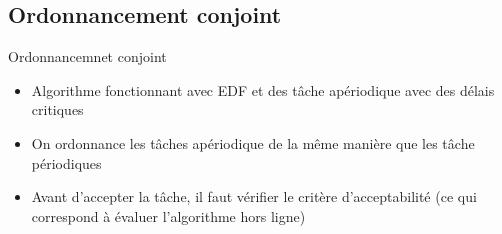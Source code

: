 \subsection{Ordonnancement conjoint}

\begin{frame}{Ordonnancemnet conjoint}
  \begin{itemize} 
  \item Algorithme fonctionnant avec EDF et des tâche apériodique avec
    des délais critiques
  \item On  ordonnance les tâches  apériodique de la même  manière que
    les tâche périodiques
  \item  Avant  d'accepter  la  tâche,  il faut  vérifier  le  critère
    d'acceptabilité (ce qui correspond à évaluer l'algorithme hors ligne)
  \end{itemize} 
\end{frame} 


%



